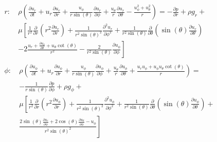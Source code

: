 \begin{align}
\begin{split}
 r:\  &
\rho \left(\frac{\partial u_r}{\partial t} + u_r \frac{\partial u_r}{\partial r} + \frac{u_{\phi}}{r \sin(\theta)} \frac{\partial u_r}{\partial \phi} +
                   \frac{u_{\theta}}{r} \frac{\partial u_r}{\partial \theta} - \frac{u_{\phi}^2 + u_{\theta}^2}{r}\right) =
           -\frac{\partial p}{\partial r} + \rho g_r + \\
       &\mu \left[\frac{1}{r^2} \frac{\partial}{\partial r}\left(r^2 \frac{\partial u_r}{\partial r}\right) +
                  \frac{1}{r^2 \sin(\theta)^2} \frac{\partial^2 u_r}{\partial \phi^2} +
                  \frac{1}{r^2 \sin(\theta)} \frac{\partial}{\partial \theta}\left(\sin(\theta) \frac{\partial u_r}{\partial \theta}\right)\right.\\
                  &\left.- 2\frac{u_r +
                  \frac{\partial u_{\theta}}{\partial \theta} + u_{\theta} \cot(\theta)}{r^2} - \frac{2}{r^2 \sin(\theta)} \frac{\partial u_{\phi}}{\partial \phi}
            \right]
\end{split}
\label{eq:navier-stokes-momentum-r}
\\
\begin{split}
  \phi:\  &\rho \left(\frac{\partial u_{\phi}}{\partial t} + u_r \frac{\partial u_{\phi}}{\partial r} +
                      \frac{u_{\phi}}{r \sin(\theta)} \frac{\partial u_{\phi}}{\partial \phi} + \frac{u_{\theta}}{r} \frac{\partial u_{\phi}}{\partial \theta} +
                      \frac{u_r u_{\phi} + u_{\phi} u_{\theta} \cot(\theta)}{r}\right) =\\
               &-\frac{1}{r \sin(\theta)} \frac{\partial p}{\partial \phi} + \rho g_{\phi} + \\
          &\mu \left[\frac{1}{r^2} \frac{\partial}{\partial r}\left(r^2 \frac{\partial u_{\phi}}{\partial r}\right) +
                     \frac{1}{r^2 \sin(\theta)^2} \frac{\partial^2 u_{\phi}}{\partial \phi^2} +
                     \frac{1}{r^2 \sin(\theta)} \frac{\partial}{\partial \theta}\left(\sin(\theta) \frac{\partial u_{\phi}}{\partial \theta}\right) +\right.\\
                     &\left.
                     \frac{2 \sin(\theta) \frac{\partial u_r}{\partial \phi} + 2 \cos(\theta) \frac{\partial u_{\theta}}{\partial \phi} -
                     u_{\phi}}{r^2 \sin(\theta)^2}
               \right] 
\end{split}
\label{eq:navier-stokes-momentum-phi}
\\

\end{align}
